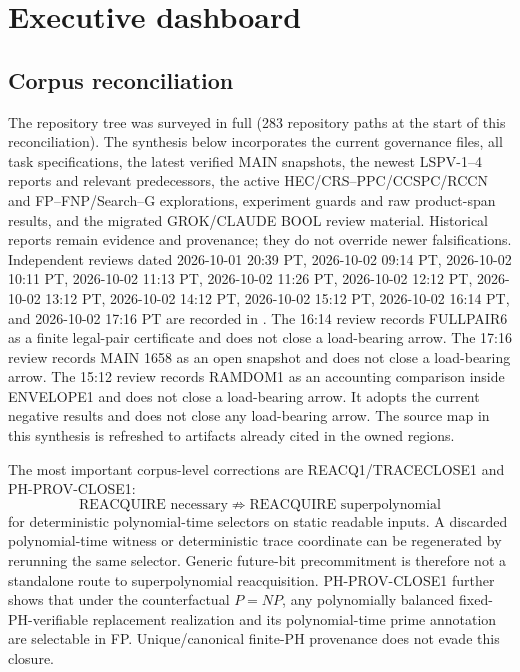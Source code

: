 \documentclass[11pt]{article}
\begin{document}
\section{Executive dashboard}

\subsection{Corpus reconciliation}

The repository tree was surveyed in full (283 repository paths at the start of this reconciliation).
The synthesis below incorporates the current governance files, all task specifications, the latest
verified MAIN snapshots, the newest LSPV-1--4 reports and relevant predecessors, the active
HEC/CRS--PPC/CCSPC/RCCN and FP--FNP/Search--G explorations, experiment guards and raw product-span
results, and the migrated GROK/CLAUDE BOOL review material. Historical reports remain evidence and
provenance; they do not override newer falsifications.
Independent reviews dated 2026-10-01 20:39 PT, 2026-10-02 09:14 PT, 2026-10-02 10:11 PT, 2026-10-02 11:13 PT, 2026-10-02 11:26 PT, 2026-10-02 12:12 PT, 2026-10-02 13:12 PT, 2026-10-02 14:12 PT, 2026-10-02 15:12 PT, 2026-10-02 16:14 PT, and 2026-10-02 17:16 PT are recorded in . The 16:14 review records FULLPAIR6 as a finite legal-pair certificate and does not close a load-bearing arrow. The 17:16 review records MAIN 1658 as an open snapshot and does not close a load-bearing arrow. The 15:12 review records RAMDOM1 as an accounting comparison inside ENVELOPE1 and does not close a load-bearing arrow.
It adopts the current negative results and does not close any load-bearing arrow.
The source map in this synthesis is refreshed to artifacts already cited in the owned regions.

The most important corpus-level corrections are REACQ1/TRACECLOSE1 and PH-PROV-CLOSE1:
\[
\boxed{\text{REACQUIRE necessary}\;\not\Rightarrow\;\text{REACQUIRE superpolynomial}}
\]
for deterministic polynomial-time selectors on static readable inputs. A discarded polynomial-time
witness or deterministic trace coordinate can be regenerated by rerunning the same selector.
Generic future-bit precommitment is therefore not a standalone route to superpolynomial
reacquisition. PH-PROV-CLOSE1 further shows that under the counterfactual \(P=NP\), any
polynomially balanced fixed-PH-verifiable replacement realization and its polynomial-time prime
annotation are selectable in FP. Unique/canonical finite-PH provenance does not evade this closure.
\end{document}
